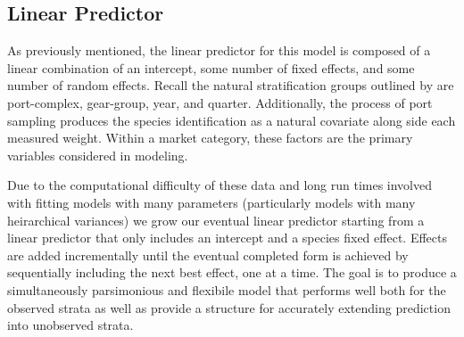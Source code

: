 \documentclass[12pt]{article}
\begin{document}
%


%
%
\subsection{Linear Predictor}\label{lp}
%
%

%
As previously mentioned, the linear predictor for this model is composed of a 
linear combination of an intercept, some number of fixed effects, 
and some number of random effects. Recall the natural stratification groups 
outlined by \cite{sen_sampling_1984} are port-complex, gear-group, year, and 
quarter. Additionally, the process of port sampling produces the species 
identification as a natural covariate along side each measured weight. Within 
a market category, these factors are the primary variables considered in 
modeling.

%
Due to the computational difficulty of these data and long run times involved 
with fitting models with many parameters (particularly models with many 
heirarchical variances) we grow our eventual linear predictor starting from a 
linear predictor that only includes an intercept and a species fixed effect. 
Effects are added incrementally until the eventual completed form is achieved 
by sequentially including the next best effect, one at a time. 
%
The goal is to %
produce a simultaneously parsimonious and flexibile model that performs well 
both for the observed strata as well as provide a structure for accurately 
extending prediction into unobserved strata. 
%
\end{document}
